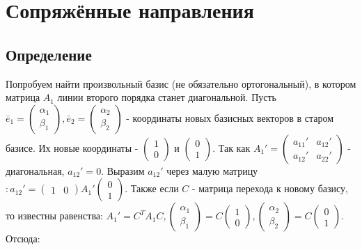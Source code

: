 \documentclass[a4paper, 12pt]{article}
\theoremstyle{definition}
\begin{document}
	\section{Сопряжённые направления}
	\subsection{Определение}
	Попробуем найти произвольный базис (не обязательно ортогональный), в котором матрица $A_1$ линии второго порядка станет диагональной. Пусть $\bar{e}_1 = \begin{pmatrix} \alpha_1 \\ \beta_1 \end{pmatrix}, \bar{e}_2 = \begin{pmatrix} \alpha_2 \\ \beta_2 \end{pmatrix}$ - координаты новых базисных векторов в старом базисе. Их новые координаты - $\begin{pmatrix} 1 \\ 0 \end{pmatrix}$ и $\begin{pmatrix} 0 \\ 1 \end{pmatrix}$. Так как $A_1' = \begin{pmatrix}a_{11}'&a_{12}'\\a_{12}'&a_{22}'\end{pmatrix}$ - диагональная, $a_{12}' = 0$. Выразим $a_{12}'$ через малую матрицу $: a_{12}' = \begin{pmatrix} 1 & 0 \end{pmatrix}A_1'\begin{pmatrix} 0 \\ 1 \end{pmatrix}$. Также если $C$ - матрица перехода к новому базису, то известны равенства: $A_1' = C^TA_1C, \begin{pmatrix} \alpha_1 \\ \beta_1 \end{pmatrix} = C \begin{pmatrix} 1 \\ 0 \end{pmatrix}, \begin{pmatrix} \alpha_2 \\ \beta_2 \end{pmatrix} = C \begin{pmatrix} 0 \\ 1 \end{pmatrix}$. Отсюда: \begin{align*}

\end{align*}
\end{document}
